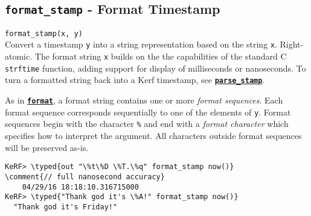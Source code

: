 \documentclass{article}
\newcommand{\typed}[1]{\textcolor{TealBlue}{#1}}
\newcommand{\comment}[1]{\textcolor{Orange}{#1}}
\newcommand{\primdefu}[3]{\subsection{\texttt{#1} - #2}\label{prim:#3}}
\newcommand{\primu}[2]{\hyperref[prim:#2]{\textbf{\texttt{#1}}}}
\newcommand{\prim}[1]{\primu{#1}{#1}}
\begin{document}
\primdefu{format\_stamp}{Format Timestamp}{formatStamp}
\texttt{format\_stamp(x, y)}\\

Convert a timestamp \texttt{y} into a string representation based on the string \texttt{x}. Right-atomic. The format string \texttt{x} builds on the the capabilities of the standard C \texttt{strftime} function, adding support for display of milliseconds or nanoseconds. To turn a formatted string back into a Kerf timestamp, see \primu{parse\_stamp}{parseStamp}.

\vspace{0.5cm}

As in \prim{format}, a format string contains one or more \emph{format sequences}. Each format sequence corresponds sequentially to one of the elements of \texttt{y}. Format sequences begin with the character \texttt{\%} and end with a \emph{format character} which specifies how to interpret the argument. All characters outside format sequences will be preserved as-is.

\begin{Verbatim}
KeRF> \typed{out "\%t\%D \%T.\%q" format_stamp now()}       \comment{// full nanosecond accuracy}
	04/29/16 18:18:10.316715000
KeRF> \typed{"Thank god it's \%A!" format_stamp now()}
  "Thank god it's Friday!"
\end{Verbatim}
\end{document}
